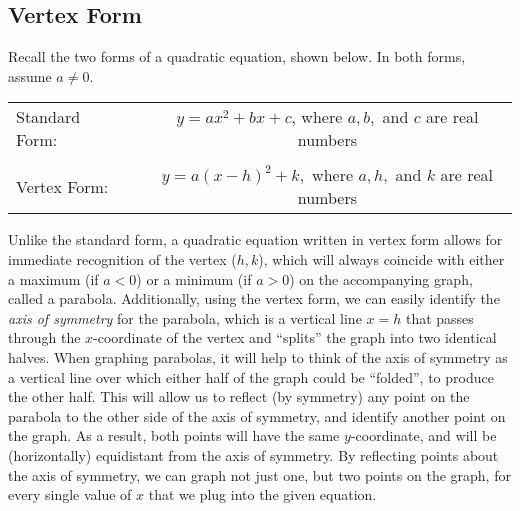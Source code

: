\subsection{Vertex Form}\pp


{}\pp

Recall the two forms of a quadratic equation, shown below.  In both forms, assume $a\neq 0$.%
\begin{center}
\begin{tabular}{lcc}
Standard Form: & & $y=ax^2+bx+c$, where $a,b,$ and $c$ are real numbers\\
&&\\
Vertex Form: & & $y=a(x-h)^2+k,$ where $a,h,$ and $k$ are real numbers
\end{tabular}
\end{center}
Unlike the standard form, a quadratic equation written in vertex form allows for immediate recognition of the vertex ($h,k$), which will always coincide with either a maximum (if $a<0$) or a minimum (if $a>0$) on the accompanying graph, called a parabola. Additionally, using the vertex form, we can easily identify the \textit{axis of symmetry} for the parabola, which is a vertical line $x=h$ that passes through the $x$-coordinate of the vertex and ``splits'' the graph into two identical halves.\pp
When graphing parabolas, it will help to think of the axis of symmetry as a vertical line over which either half of the graph could be ``folded'', to produce the other half.  This will allow us to reflect (by symmetry) any point on the parabola to the other side of the axis of symmetry, and identify another point on the graph.  As a result, both points will have the same $y$-coordinate, and will be (horizontally) equidistant from the axis of symmetry.  By reflecting points about the axis of symmetry, we can graph not just one, but two points on the graph, for every single value of $x$ that we plug into the given equation.  %


